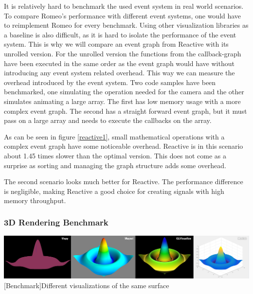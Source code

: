 It is relatively hard to benchmark the used event system in real world scenarios. To compare Romeo's performance with different event systems, one would have to reimplement Romeo for every benchmark.
Using other visualization libraries as a baseline is also difficult, as it is hard to isolate the performance of the event system.
This is why we will compare an event graph from Reactive with its unrolled version.
For the unrolled version the functions from the callback-graph have been executed in the same order as the event graph would have without introducing any event system related overhead.
This way we can measure the overhead introduced by the event system.
Two code samples have been benchmarked, one simulating the operation needed for the camera and the other simulates animating a large array.
The first has low memory usage with a more complex event graph. The second has a straight forward event graph, but it must pass on a large array and needs to execute the callbacks on the array.

As can be seen in figure \cref{reactive1}, small mathematical operations with a complex event graph have some noticeable overhead. Reactive is in this scenario about 1.45 times slower than the optimal version.
This does not come as a surprise as sorting and managing the graph structure adds some overhead.

The second scenario looks much better for Reactive. The performance difference is negligible, making Reactive a good choice for creating signals with high memory throughput.

\subsubsection{3D Rendering Benchmark}

\begin{minipage}{\linewidth}
    \centering
    \includegraphics[width=\linewidth]{graphics/vispy_mayavi_romeo.jpg}
    [Benchmark]{Different visualizations of the same surface}
    \label{fig:reactive1}
\end{minipage}

